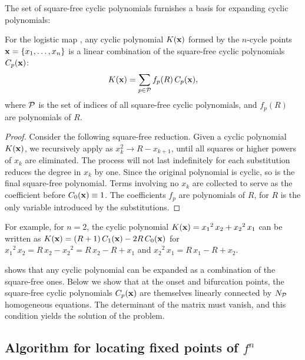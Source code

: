 \documentclass[twocolumn]{revtex4-1}
\begin{document}
The set of square-free cyclic polynomials
  furnishes a basis for expanding cyclic polynomials:


\begin{theorem}
  For the logistic map ,
  any cyclic polynomial $K(\mathbf{x})$
  formed by the $n$-cycle points
  $\mathbf{x} = \{x_1, \ldots, x_n\}$
  is a linear combination of
the square-free cyclic polynomials $C_p(\mathbf{x})$:
\[
  K(\mathbf{x}) = \sum_{p \in \mathcal P} f_p(R) \, C_p(\mathbf{x}),
\]
  where $\mathcal P$ %
  is the set of indices of all square-free cyclic polynomials,
  and $f_p(R)$ are polynomials of $R$.
  \label{thm:sqrfree}
\end{theorem}


\begin{proof}
Consider the following square-free reduction.
%
Given a cyclic polynomial $K(\mathbf{x})$,
  we recursively apply  as
  $x_k^2 \rightarrow R - x_{k+1}$,
  until all squares or higher powers of $x_k$ are eliminated.
The process will not last indefinitely
  for each substitution reduces the degree in $x_k$ %
  by one.
Since the original polynomial is cyclic,
  so is the final square-free polynomial.
Terms involving no $x_k$
  are collected to serve as the coefficient before $C_0(\mathbf{x}) \equiv 1$.
The coefficients $f_p$ are polynomials of $R$,
  for $R$ is the only variable introduced by the substitutions.
\end{proof}



For example, for $n = 2$, the cyclic polynomial
  $K(\mathbf{x}) = {x_1}^2 \, x_2 + {x_2}^2 \, x_1$
can be written as $K(\mathbf{x}) = (R + 1) \, C_{1}(\mathbf{x}) - 2 R \, C_0(\mathbf{x})$
for
${x_1}^2 \, x_2 = R \, x_2 - {x_2}^2 = R \, x_2 - R + x_1$ and
${x_2}^2 \, x_1 = R \, x_1 - R + x_2$.


  shows that any cyclic polynomial can be expanded
  as a combination of the square-free ones.
Below we show that at the onset and bifurcation points,
  the square-free cyclic polynomials $C_p(\mathbf{x})$ are themselves
  linearly connected by $N_\mathcal P$ homogeneous equations.
The determinant of the matrix must vanish,
  and this condition yields the solution of the problem.


\subsection{\label{sec:algo}Algorithm for locating fixed points of $f^n$}
\end{document}
